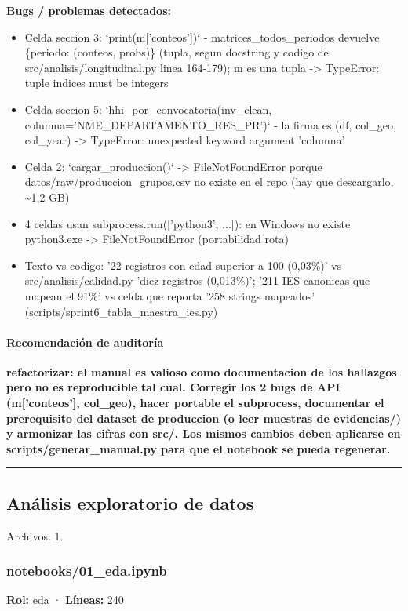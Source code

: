 \begin{tcolorbox}[riesgo]
\textbf{Bugs / problemas detectados:}
\begin{itemize}
  \item Celda seccion 3: `print(m['conteos'])` - matrices\_todos\_periodos devuelve \{periodo: (conteos, probs)\} (tupla, segun docstring y codigo de src/analisis/longitudinal.py linea 164-179); m es una tupla -> TypeError: tuple indices must be integers
  \item Celda seccion 5: `hhi\_por\_convocatoria(inv\_clean, columna='NME\_DEPARTAMENTO\_RES\_PR')` - la firma es (df, col\_geo, col\_year) -> TypeError: unexpected keyword argument 'columna'
  \item Celda 2: `cargar\_produccion()` -> FileNotFoundError porque datos/raw/produccion\_grupos.csv no existe en el repo (hay que descargarlo, \textasciitilde{}1,2 GB)
  \item 4 celdas usan subprocess.run(['python3', ...]): en Windows no existe python3.exe -> FileNotFoundError (portabilidad rota)
  \item Texto vs codigo: '22 registros con edad superior a 100 (0,03\%)' vs src/analisis/calidad.py 'diez registros (0,013\%)'; '211 IES canonicas que mapean el 91\%' vs celda que reporta '258 strings mapeados' (scripts/sprint6\_tabla\_maestra\_ies.py)
\end{itemize}
\end{tcolorbox}

\paragraph{Recomendación de auditoría}
\textbf{refactorizar: el manual es valioso como documentacion de los hallazgos pero no es reproducible tal cual. Corregir los 2 bugs de API (m['conteos'], col\_geo), hacer portable el subprocess, documentar el prerequisito del dataset de produccion (o leer muestras de evidencias/) y armonizar las cifras con src/. Los mismos cambios deben aplicarse en scripts/generar\_manual.py para que el notebook se pueda regenerar.}

\medskip
\hrule

\subsection{Análisis exploratorio de datos}
\noindent Archivos: 1.

\subsubsection{notebooks/01\_eda.ipynb}
\textbf{Rol:} eda · \textbf{Líneas:} 240

